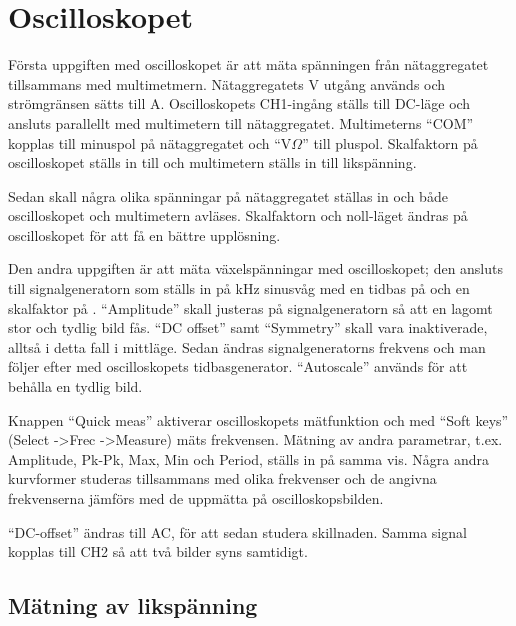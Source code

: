 \documentclass[11pt,a4paper]{article}
\begin{document}
\section{Oscilloskopet}\label{}
Första uppgiften med oscilloskopet är att mäta spänningen från nätaggregatet 
tillsammans med multimetmern. Nätaggregatets \unit[6]{\si{\volt}} utgång används och 
strömgränsen sätts till \unit[0,1]{\si{\ampere}}. Oscilloskopets CH1-ingång ställs 
till DC-läge och ansluts parallellt med multimetern till nätaggregatet. Multimeterns 
``COM'' kopplas till minuspol på nätaggregatet och ``\unit{\si{\volt}}$\Omega$'' 
till pluspol. Skalfaktorn på oscilloskopet ställs in till 
\unit[1]{} och multimetern ställs in till likspänning. 
\par Sedan skall några olika spänningar på nätaggregatet ställas in och både 
oscilloskopet och multimetern avläses. Skalfaktorn och noll-läget ändras på 
oscilloskopet för att få en bättre upplösning.
\\
\par Den andra uppgiften är att mäta växelspänningar med oscilloskopet; den ansluts 
till signalgeneratorn som ställs in på \unit[1]{\si{\kilo\hertz}} sinusvåg med en 
tidbas på \unit[500]{} och en skalfaktor på 
\unit[1]{}. ``Amplitude'' skall justeras på 
signalgeneratorn så att en lagomt stor och tydlig bild fås. ``DC offset'' samt 
``Symmetry'' skall vara inaktiverade, alltså i detta fall i mittläge. Sedan ändras 
signalgeneratorns frekvens och man följer efter med oscilloskopets tidbasgenerator. 
``Autoscale'' används för att behålla en tydlig bild.
\par Knappen ``Quick meas'' aktiverar oscilloskopets mätfunktion och med ``Soft 
keys'' (Select -\textgreater Frec -\textgreater Measure) mäts frekvensen. Mätning av 
andra para\-metrar, t.ex. Amplitude, Pk-Pk, Max, Min och Period, ställs in på samma 
vis. Några andra kurvformer studeras tillsammans med olika frekvenser och de angivna 
frekvenserna jämförs med de uppmätta på oscilloskopsbilden.
\par ``DC-offset'' ändras till AC, för att sedan studera skillnaden. Samma signal 
kopplas till CH2 så att två bilder syns samtidigt. 


\subsection{Mätning av likspänning}\label{meas_dc}
\end{document}
